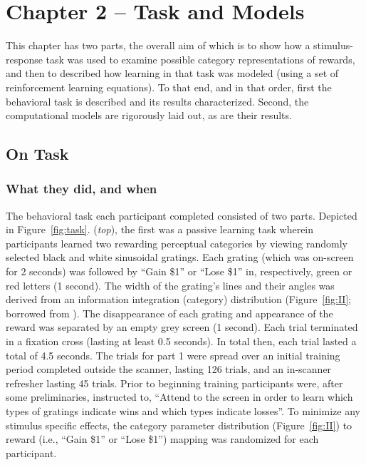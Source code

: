 \section{Chapter 2 -- Task and Models} %
\label{sec:task_and_models}
This chapter has two parts, the overall aim of which is to show how a stimulus-response task was used to examine possible category representations of rewards, and then to described how learning in that task was modeled (using a set of reinforcement learning equations).  To that end, and in that order, first the behavioral task is described and its results characterized.  Second, the computational models are rigorously laid out, as are their results.

\subsection{On Task}
\label{sub:to_task}
\subsubsection{What they did, and when}
\label{subsub:whatwhen}
The behavioral task each participant completed consisted of two parts.  Depicted in Figure~\ref{fig:task}. (\emph{top}), the first was a passive learning task wherein participants learned two rewarding perceptual categories by viewing randomly selected black and white sinusoidal gratings.  Each grating (which was on-screen for 2 seconds) was followed by ``Gain \$1'' or ``Lose \$1'' in, respectively, green or red letters (1 second).  The width of the grating's lines and their angles was derived from an information integration (category) distribution (Figure~\ref{fig:II}; borrowed from \citep{Spiering:2008p5008}).  The disappearance of each grating and appearance of the reward was separated by an empty grey screen (1 second).  Each trial terminated in a fixation cross (lasting at least 0.5 seconds). In total then, each trial lasted a total of 4.5 seconds.  The trials for part 1 were spread over an initial training period completed outside the scanner, lasting 126 trials, and an in-scanner refresher lasting 45 trials.  Prior to beginning training participants were, after some preliminaries, instructed to, ``Attend to the screen in order to learn which types of gratings indicate wins and which types indicate losses''.  To minimize any stimulus specific effects, the category parameter distribution (Figure~\ref{fig:II}) to reward (i.e., ``Gain \$1'' or ``Lose \$1'') mapping was randomized for each participant.

